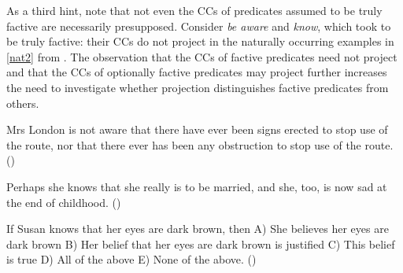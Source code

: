 \documentclass{language}
\newcommand{\6}{\mbox{$[\hspace*{-.6mm}[$}}
\newcommand{\9}{\mbox{$]\hspace*{-.6mm}]$}}
\begin{document}

As a third hint, note that not even the CCs of predicates assumed to be truly factive are necessarily presupposed. Consider {\em be aware} and {\em know}, which \citet{karttunen71b} took to be truly factive: their CCs do not project in the naturally occurring examples in \ref{nat2} from \citealt{beaver-belly}. The observation that the CCs of factive predicates need not project and that the CCs of optionally factive predicates may project further increases the need to investigate whether projection distinguishes factive predicates from others.

\begin{exe}
\ex\label{nat2}

\begin{xlist}

\ex Mrs London is not aware that there have ever been signs erected to stop use of the route, nor that there ever has been  any obstruction to stop use of the route. \hfill (\citealt[83]{beaver-belly})

\ex Perhaps she knows that she really is to be married, and she, too, is now sad at the end of childhood. \hfill (\citealt[86]{beaver-belly})

\ex If Susan knows that her eyes are dark brown, then A) She believes her eyes are dark brown B) Her belief that her eyes are dark brown is justified C) This belief is true D) All of the above E) None of the above. \hfill (\citealt[84]{beaver-belly})

\end{xlist}
\end{exe}
\end{document}
